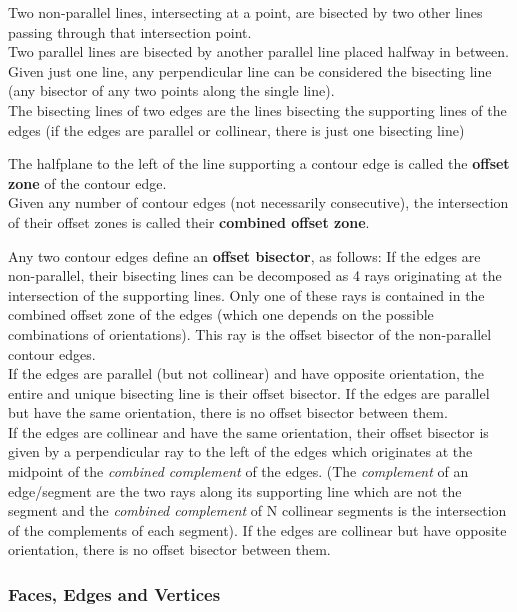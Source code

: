 Two non-parallel lines, intersecting at a point, are bisected by two other lines passing through that intersection point.\\
Two parallel lines are bisected by another parallel line placed halfway in between.\\
Given just one line, any perpendicular line can be considered the bisecting line (any bisector of any two points along the single line).\\
The bisecting lines of two edges are the lines bisecting the supporting lines of the edges (if the edges are parallel or collinear, there is just one bisecting line)

The halfplane to the left of the line supporting a contour edge is called the \textbf{offset zone} of the contour edge.\\
Given any number of contour edges (not necessarily consecutive), the intersection of their offset zones is called their \textbf{combined offset zone}.

Any two contour edges define an \textbf{offset bisector}, as follows:
If the edges are non-parallel, their bisecting lines can be decomposed as 4 rays originating at the intersection of the supporting lines. Only one of these rays is contained in the combined offset zone of the  edges (which one depends on the possible combinations of orientations). This ray is the offset bisector of the non-parallel contour edges.\\
If the edges are parallel (but not collinear) and have opposite orientation, the entire and unique bisecting line is their offset bisector. If the edges are parallel but have the same orientation, there is no offset bisector between them.\\
If the edges are collinear and have the same orientation, their offset bisector is given by a perpendicular ray to the left of the edges which originates at the midpoint of the \textit{combined complement} of the edges. (The \textit{complement} of an edge/segment are the two rays along its supporting line which are not the segment and the \textit{combined complement} of N collinear segments is the intersection of the complements of each segment). If the edges are collinear but have opposite orientation, there is no offset bisector between them.


\subsubsection{Faces, Edges and Vertices}

